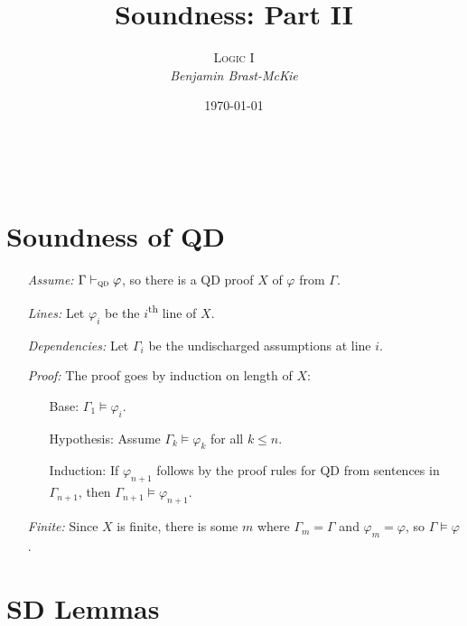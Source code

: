 \documentclass[a4paper, 11pt]{article} %
\title{\textbf{Soundness: Part II}} %
\author{\textsc{Logic I}\\ \em Benjamin Brast-McKie} %
\date{\today} %
\makeatletter
\def\metaA{\ensuremath{\varphi}}
\renewcommand{\maketitle}{ %
\begin{flushright} %
{\LARGE\@title} %

\vspace{10pt} %

{\@author} %
\\\@date %

\vspace{0pt} %
\end{flushright}
}
\makeatother
\begin{document}
\maketitle %

\thispagestyle{empty}





\section*{Soundness of QD}

\begin{enumerate}
  \item[\it Assume:] $\Gamma \vdash_{\textsc{qd}} \varphi$, so there is a QD proof $X$ of $\varphi$ from $\Gamma$. 
  \item[\it Lines:] Let $\varphi_i$ be the $i$\textsuperscript{th} line of $X$.
  \item[\it Dependencies:] Let $\Gamma_i$ be the undischarged assumptions at line $i$. 
  \item[\it Proof:] The proof goes by induction on length of $X$:
    \begin{itemize}
      \item[\sc Base:] $\Gamma_1 \vDash \varphi_i$. 
      \item[\sc Hypothesis:] Assume $\Gamma_k \vDash \varphi_k$ for all $k\leq n$.
      \item[\sc Induction:] If $\metaA_{n+1}$ follows by the proof rules for QD from sentences in $\Gamma_{n+1}$, then $\Gamma_{n+1} \vDash \metaA_{n+1}$.
    \end{itemize}
  \item[\it Finite:] Since $X$ is finite, there is some $m$ where $\Gamma_m=\Gamma$ and $\varphi_m=\varphi$, so $\Gamma \vDash \varphi$.
\end{enumerate}




\section*{SD Lemmas}
\end{document}
